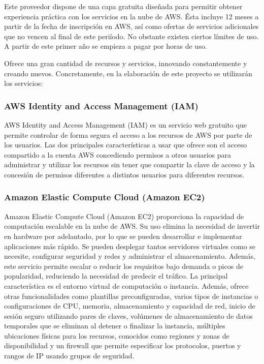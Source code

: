 Este proveedor dispone de una capa gratuita diseñada para permitir obtener experiencia práctica con los servicios en la nube de AWS. Ésta incluye 12 meses a partir de la fecha de inscripción en AWS, así como ofertas de servicios adicionales que no vencen al final de este periíodo. No obstante existen ciertos límites de uso. A partir de este primer año se empieza a pagar por horas de uso.

Ofrece una gran cantidad de recursos y servicios, innovando constantemente y creando nuevos. Concretamente, en la elaboración de este proyecto se utilizarán los servicios:

\subsubsection{AWS Identity and Access Management (IAM)}

AWS Identity and Access Management (IAM) es un servicio web gratuito que permite controlar de forma segura el acceso a los recursos de AWS por parte de los usuarios. Las dos principales características a usar que ofrece son el acceso compartido a la cuenta AWS concediendo permisos a otros usuarios para administrar y utilizar los recursos sin tener que compartir la clave de acceso y la concesión de permisos diferentes a distintos usuarios para diferentes recursos.

\subsubsection{Amazon Elastic Compute Cloud (Amazon EC2)}

Amazon Elastic Compute Cloud (Amazon EC2) proporciona la capacidad de computación escalable en la nube de AWS. Su uso elimina la necesidad de invertir en hardware por adelantado, por lo que se pueden desarrollar e implementar aplicaciones más rápido. Se pueden desplegar tantos servidores virtuales como se necesite, configurar seguridad y redes y administrar el almacenamiento. Además, este servicio permite escalar o reducir los requisitos bajo demanda o picos de popularidad, reduciendo la necesidad de predecir el tráfico. La principal característica es el entorno virtual de computación o instancia. Además, ofrece otras funcionalidades como plantillas preconfiguradas, varios tipos de instancias o configuraciones de CPU, memoria, almacenamiento y capacidad de red, inicio de sesión seguro utilizando pares de claves, volúmenes de almacenamiento de datos temporales que se eliminan al detener o finalizar la instancia, múltiples ubicaciones físicas para los recursos, conocidos como regiones y zonas de disponibilidad y un firewall que permite especificar los protocolos, puertos y rangos de IP usando grupos de seguridad.

